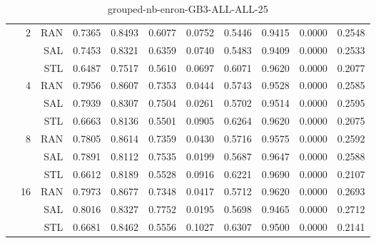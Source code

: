 \begin{center}
\begin{table}[htbp]
\begin{tabular}{ | r | r | r | r | r | r | r | r | r | r | r |}
 & \multirow{3}{*}{2} & RAN & 0.7365 & 0.8493 & 0.6077 & 0.0752 & 0.5446 & 0.9415 & 0.0000 & 0.2548\\ \cline{3-11}
 &   & SAL & 0.7453 & 0.8321 & 0.6359 & 0.0740 & 0.5483 & 0.9409 & 0.0000 & 0.2533\\ \cline{3-11}
 &   & STL & 0.6487 & 0.7517 & 0.5610 & 0.0697 & 0.6071 & 0.9620 & 0.0000 & 0.2077\\ \cline{2-11}
 & \multirow{3}{*}{4} & RAN & 0.7956 & 0.8607 & 0.7353 & 0.0444 & 0.5743 & 0.9528 & 0.0000 & 0.2585\\ \cline{3-11}
 &   & SAL & 0.7939 & 0.8307 & 0.7504 & 0.0261 & 0.5702 & 0.9514 & 0.0000 & 0.2595\\ \cline{3-11}
 &   & STL & 0.6663 & 0.8136 & 0.5501 & 0.0905 & 0.6264 & 0.9620 & 0.0000 & 0.2075\\ \cline{2-11}
 & \multirow{3}{*}{8} & RAN & 0.7805 & 0.8614 & 0.7359 & 0.0430 & 0.5716 & 0.9575 & 0.0000 & 0.2592\\ \cline{3-11}
 &   & SAL & 0.7891 & 0.8112 & 0.7535 & 0.0199 & 0.5687 & 0.9647 & 0.0000 & 0.2588\\ \cline{3-11}
 &   & STL & 0.6612 & 0.8189 & 0.5528 & 0.0916 & 0.6221 & 0.9690 & 0.0000 & 0.2107\\ \cline{2-11}
 & \multirow{3}{*}{16} & RAN & 0.7973 & 0.8677 & 0.7348 & 0.0417 & 0.5712 & 0.9620 & 0.0000 & 0.2693\\ \cline{3-11}
 &   & SAL & 0.8016 & 0.8327 & 0.7752 & 0.0195 & 0.5698 & 0.9465 & 0.0000 & 0.2712\\ \cline{3-11}
 &   & STL & 0.6681 & 0.8462 & 0.5556 & 0.1027 & 0.6307 & 0.9500 & 0.0000 & 0.2141\\ \cline{2-11}
\hline
\end{tabular}
\caption{grouped-nb-enron-GB3-ALL-ALL-25}
\end{table}
\end{center}

